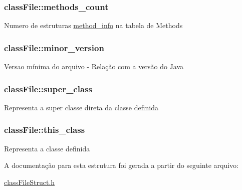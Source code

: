 \subsubsection[{\texorpdfstring{methods\+\_\+count}{methods_count}}]{ class\+File\+::methods\+\_\+count}\hypertarget{structclassFile_a8c3eb4279e03c8b8f6525b6dd0ff6126}{}\label{structclassFile_a8c3eb4279e03c8b8f6525b6dd0ff6126}
Numero de estruturas \hyperlink{structmethod__info}{method\+\_\+info} na tabela de Methods 
\subsubsection[{\texorpdfstring{minor\+\_\+version}{minor_version}}]{ class\+File\+::minor\+\_\+version}\hypertarget{structclassFile_aa7b4e7ee91468a9a2989dd9ec93c3ea0}{}\label{structclassFile_aa7b4e7ee91468a9a2989dd9ec93c3ea0}
Versao mínima do arquivo -\/ Relação com a versão do Java 
\subsubsection[{\texorpdfstring{super\+\_\+class}{super_class}}]{ class\+File\+::super\+\_\+class}\hypertarget{structclassFile_a7d16e11061e4520ac93df39a5a65a215}{}\label{structclassFile_a7d16e11061e4520ac93df39a5a65a215}
Representa a super classe direta da classe definida 
\subsubsection[{\texorpdfstring{this\+\_\+class}{this_class}}]{ class\+File\+::this\+\_\+class}\hypertarget{structclassFile_a152ce2f57b3fa175b95069452f9fa063}{}\label{structclassFile_a152ce2f57b3fa175b95069452f9fa063}
Representa a classe definida 

A documentação para esta estrutura foi gerada a partir do seguinte arquivo\+:\begin{DoxyCompactItemize}
\item 
\hyperlink{classFileStruct_8h}{class\+File\+Struct.\+h}\end{DoxyCompactItemize}

